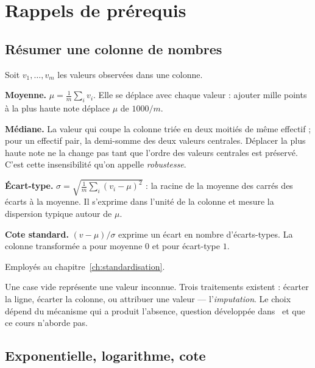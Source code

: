 \chapter{Rappels de prérequis}
\label{ann:prerequis}


\section{Résumer une colonne de nombres}

Soit $v_1,\dots,v_m$ les valeurs observées dans une colonne.

\textbf{Moyenne.} $\mu=\frac{1}{m}\sum_i v_i$. Elle se déplace avec chaque
valeur : ajouter mille points à la plus haute note déplace $\mu$ de
$1000/m$.

\textbf{Médiane.} La valeur qui coupe la colonne triée en deux moitiés de même
effectif ; pour un effectif pair, la demi-somme des deux valeurs centrales.
Déplacer la plus haute note ne la change pas tant que l'ordre des valeurs
centrales est préservé. C'est cette insensibilité qu'on appelle
\emph{robustesse}.

\textbf{Écart-type.} $\sigma=\sqrt{\frac{1}{m}\sum_i(v_i-\mu)^2}$ : la racine de
la moyenne des carrés des écarts à la moyenne. Il s'exprime dans l'unité de la
colonne et mesure la dispersion typique autour de $\mu$.

\textbf{Cote standard.} $(v-\mu)/\sigma$ exprime un écart en nombre d'écarts-types.
La colonne transformée a pour moyenne $0$ et pour écart-type $1$.

Employés au chapitre~\ref{ch:standardisation}.

\begin{rappel}
Une case vide représente une valeur inconnue. Trois traitements existent :
écarter la ligne,
écarter la colonne, ou attribuer une valeur --- l'\emph{imputation}. Le choix
dépend du mécanisme qui a produit l'absence, question développée
dans~\cite{littlerubin2019} et que ce cours n'aborde pas.
\end{rappel}

\section{Exponentielle, logarithme, cote}

